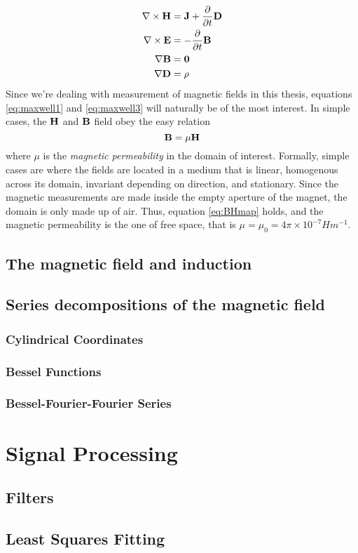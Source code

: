 \begin{align}
    \nabla \times \vb{H} & = \vb{J} + \frac{\partial}{\partial t}\vb{D}
    \label{eq:maxwell1}                                                    \\
    \nabla \times \vb{E} & = -\frac{\partial}{\partial t}\vb{B}
    \label{eq:maxwell2}                                                    \\
    \nabla \vb{B}        & = \vb{0}
    \label{eq:maxwell3}                                                    \\
    \nabla \vb{D}        & = \rho
    \label{:eqmaxwell4}
\end{align}
Since we're dealing with measurement of magnetic fields in this thesis,
equations \ref{eq:maxwell1} and \ref{eq:maxwell3} will naturally be of
the most interest. In simple cases, the $\vb{H}$ and $\vb{B}$ field
obey the easy relation 
\begin{equation}
    \vb{B} = \mu \vb{H}
    \label{eq:BHmap}
\end{equation}
where $\mu$ is the \emph{magnetic permeability} in the domain of interest.
Formally, simple cases are where the fields are located in a medium that is
linear, homogenous across its domain, invariant depending on direction, and
stationary. Since the magnetic measurements are made inside the empty aperture
of the magnet, the domain is only made up of air. Thus, equation \ref{eq:BHmap}
holds, and the magnetic permeability is the one of free space, that is
$\mu = \mu_0 = 4\pi \times 10^{-7} Hm^{-1}$. \cite[Ch.4]{russenschuck2011field}


\subsection{The magnetic field and induction}
\subsection{Series decompositions of the magnetic field}
\subsubsection{Cylindrical Coordinates}
\subsubsection{Bessel Functions}
\subsubsection{Bessel-Fourier-Fourier Series}

\section{Signal Processing}
\subsection{Filters}
\subsection{Least Squares Fitting}
